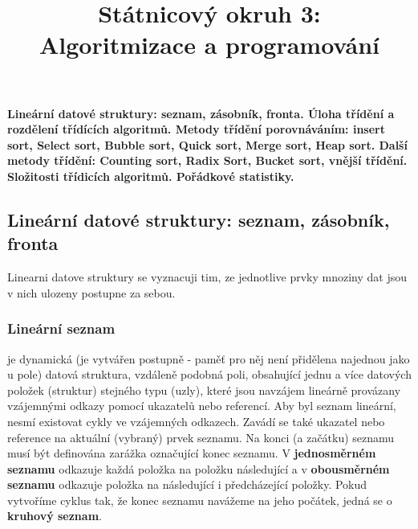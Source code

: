 \documentclass[10pt,a4paper]{article}
\begin{document}
\title{Státnicový okruh 3: \\ Algoritmizace a programování}
\maketitle
\newpage
\tableofcontents
\newpage

\section{}
\paragraph{Lineární datové struktury: seznam, zásobník, fronta. Úloha třídění a rozdělení třídících algoritmů. Metody třídění porovnáváním: insert sort, Select sort, Bubble sort, Quick sort, Merge sort, Heap sort. Další metody třídění: Counting sort, Radix Sort, Bucket sort, vnější třídění. Složitosti třídicích algoritmů. Pořádkové statistiky.}

\subsection{Lineární datové struktury: seznam, zásobník, fronta}
Linearni datove struktury se vyznacuji tim, ze jednotlive prvky mnoziny dat jsou v nich ulozeny postupne za sebou.
\subsubsection{Lineární seznam}
je dynamická (je vytvářen postupně - paměť pro něj není přidělena najednou jako u pole) datová struktura, vzdáleně podobná poli, obsahující jednu a více datových položek (struktur) stejného typu (uzly), které jsou navzájem lineárně provázany vzájemnými odkazy pomocí ukazatelů nebo referencí. Aby byl seznam lineární, nesmí existovat cykly ve vzájemných odkazech. Zavádí se také ukazatel nebo reference na aktuální (vybraný) prvek seznamu. Na konci (a začátku) seznamu musí být definována zarážka označující konec seznamu. V \textbf{jednosměrném seznamu} odkazuje každá položka na položku následující a v \textbf{obousměrném seznamu} odkazuje položka na následující i předcházející položky. Pokud vytvoříme cyklus tak, že konec seznamu navážeme na jeho počátek, jedná se o \textbf{kruhový seznam}.
\end{document}
